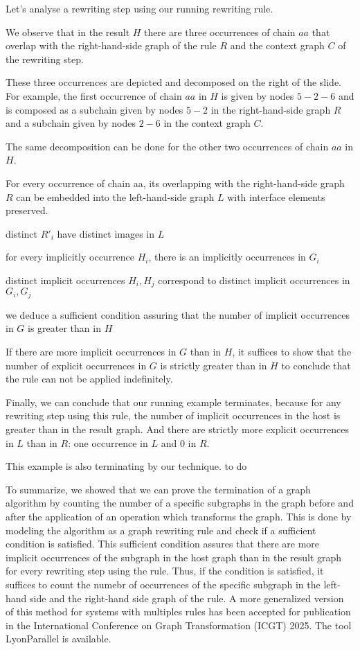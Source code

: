         Let's analyse a rewriting step using our running rewriting rule.


        We observe that in the result $H$ there are three occurrences of chain $aa$ that overlap with the right-hand-side graph of the rule $R$ and the context graph $C$ of the rewriting step.

       These three occurrences are depicted and decomposed on the right of the slide. For example, the first occurrence of chain $aa$ in $H$ is given by nodes $5-2-6$ and is composed as a subchain given by nodes $5-2$ in the right-hand-side graph $R$ and a subchain given by nodes $2-6$ in the context graph $C$.

       The same decomposition can be done for the other two occurrences of chain $aa$ in $H$. 


        For every occurrence of chain aa, its overlapping with the right-hand-side graph $R$ can be embedded into the left-hand-side graph $L$ with interface elements preserved.



        distinct $R'_i$ have distinct images in $L$



        for every implicitly occurrence $H_i$, there is an implicitly occurrences in $G_i$


    distinct implicit occurrences $H_i, H_j$ correspond to distinct implicit occurrences in $G_i, G_j$


    we deduce a sufficient condition assuring that the number of implicit occurrences in $G$ is greater than in $H$


        If there are more implicit occurrences in $G$ than in $H$, it suffices to show that the number of explicit occurrences in $G$ is strictly greater than in $H$ to conclude that the rule can not be applied indefinitely.



         Finally, we can conclude that our running example terminates, because for any rewriting step using this rule, the number of implicit occurrences in the host is greater than in the result graph. 
    And there are strictly more explicit occurrences in \( L \) than in \( R \): one occurrence in $L$ and $0$ in $R$.


    This example is also terminating by our technique.
        to do



         To summarize, we showed that we can prove the termination of a graph algorithm by counting the number of a specific subgraphs in the graph before and after the application of an operation which transforms the graph. This is done by modeling the algorithm as a graph rewriting rule and check if a sufficient condition is satisfied. This sufficient condition assures that there are more implicit occurrences of the subgraph in the host graph than in the result graph for every rewriting step using the rule. Thus, if the condition is satisfied, it suffices to count the numebr of occurrences of the specific subgraph in the left-hand side and the right-hand side graph of the rule. A more generalized version of this method for systems with multiples rules has been accepted for publication in the International Conference on Graph Transformation (ICGT) 2025. The tool LyonParallel is available.
